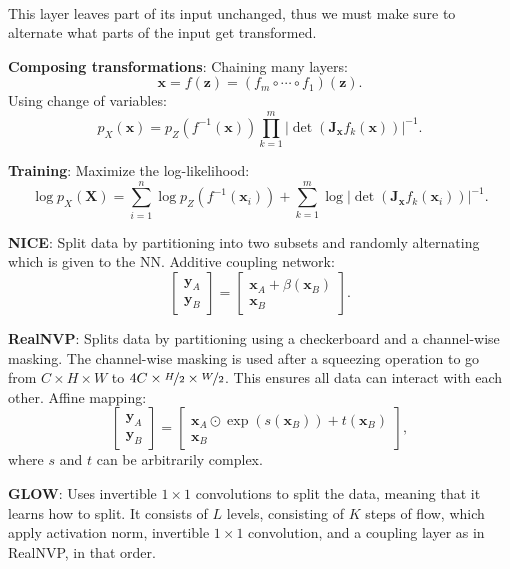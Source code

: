 \documentclass{article}
\renewcommand{\vec}[1]{\bm{#1}}
\newcommand{\mat}[1]{\bm{#1}}
\newenvironment{topic}[1]
{\textbf{\sffamily \colorbox{black}{\rlap{\textbf{\textcolor{white}{#1}}}\hspace{\linewidth}\hspace{-2\fboxsep}}} \\ \vspace{0.2cm}}
{}
\begin{document}
\begin{multicols*}{2}
\begin{topic}{Normalizing flow}
        This layer leaves part of its input unchanged, thus we must make sure to alternate what parts of
        the input get transformed.

        \textbf{Composing transformations}: Chaining many layers: \[
            \vec{x} = f(\vec{z}) = (f_m \circ \cdots \circ f_1)(\vec{z}).
        \]
        Using change of variables: \[
            p_X(\vec{x}) = p_Z(f^{-1}(\vec{x})) \prod_{k=1}^m |\det(\mat{J}_{\vec{x}} f_k(\vec{x}))|^{-1}.
        \]

        \textbf{Training}: Maximize the log-likelihood: \[
            \log p_{X}(\mat{X}) = \sum_{i=1}^{n} \log p_Z(f^{-1}(\vec{x}_i)) + \sum_{k=1}^{m} \log |\det(\mat{J}_{\vec{x}} f_k(\vec{x}_i))|^{-1}.
        \]

        \textbf{NICE}: Split data by partitioning into two subsets and randomly alternating which is given to the NN. Additive coupling network: \[
            \begin{bmatrix} \vec{y}_A \\ \vec{y}_B \end{bmatrix}
            =
            \begin{bmatrix} \vec{x}_A + \beta(\vec{x}_B) \\ \vec{x}_B \end{bmatrix}.
        \]

        \textbf{RealNVP}: Splits data by partitioning using a checkerboard and a channel-wise
        masking. The channel-wise masking is used after a squeezing operation to go from $C\times H
            \times W$ to $4C \times \nicefrac{H}{2} \times \nicefrac{W}{2}$. This ensures all data can interact with each other. Affine mapping: \[
            \begin{bmatrix} \vec{y}_A \\ \vec{y}_B \end{bmatrix} = \begin{bmatrix} \vec{x}_A \odot \exp(s(\vec{x}_B)) + t(\vec{x}_B) \\ \vec{x}_B \end{bmatrix},
        \]
        where $s$ and $t$ can be arbitrarily complex.

        \textbf{GLOW}: Uses invertible $1\times 1$ convolutions to split the data, meaning that it
        learns how to split. It consists of $L$ levels, consisting of $K$ steps of flow, which apply
        activation norm, invertible $1 \times 1$ convolution, and a coupling layer as in RealNVP, in
        that order.


\end{topic}
\end{multicols*}
\end{document}
